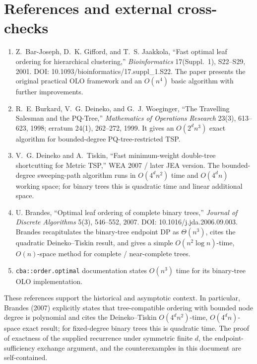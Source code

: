\documentclass[11pt]{article}
\theoremstyle{plain}
\begin{document}
\section*{References and external cross-checks}

\begin{enumerate}[label=\arabic*.]
\item Z.\ Bar-Joseph, D.~K. Gifford, and T.~S. Jaakkola, ``Fast optimal leaf
  ordering for hierarchical clustering,'' \emph{Bioinformatics} 17(Suppl.\ 1),
  S22--S29, 2001. DOI: 10.1093/bioinformatics/17.suppl\_1.S22. The paper
  presents the original practical OLO framework and an \(O(n^4)\) basic
  algorithm with further improvements.
\item R.~E. Burkard, V.~G. Deineko, and G.~J. Woeginger, ``The Travelling
  Salesman and the PQ-Tree,'' \emph{Mathematics of Operations Research} 23(3),
  613--623, 1998; erratum 24(1), 262--272, 1999. It gives an \(O(2^d n^3)\)
  exact algorithm for bounded-degree PQ-tree-restricted TSP.
\item V.~G. Deineko and A.~Tiskin, ``Fast minimum-weight double-tree
  shortcutting for Metric TSP,'' WEA 2007 / later JEA version. The
  bounded-degree sweeping-path algorithm runs in \(O(4^d n^2)\) time and
  \(O(4^d n)\) working space; for binary trees this is quadratic time and
  linear additional space.
\item U. Brandes, ``Optimal leaf ordering of complete binary trees,''
  \emph{Journal of Discrete Algorithms} 5(3), 546--552, 2007. DOI:
  10.1016/j.jda.2006.09.003. Brandes recapitulates the binary-tree endpoint DP
  as \(\Theta(n^3)\), cites the quadratic Deineko--Tiskin result, and gives a
  simple \(O(n^2\log n)\)-time, \(O(n)\)-space method for complete /
  near-complete trees.
\item \texttt{cba::order.optimal} documentation states \(O(n^3)\) time for its
  binary-tree OLO implementation.
\end{enumerate}

These references support the historical and asymptotic context. In particular,
Brandes (2007) explicitly states that tree-compatible ordering with bounded
node degree is polynomial and cites the Deineko--Tiskin
\(O(4^d n^2)\)-time, \(O(4^d n)\)-space exact result; for fixed-degree binary
trees this is quadratic time. The proof of exactness of the supplied recurrence
under symmetric finite \(d\), the endpoint-sufficiency exchange argument, and
the counterexamples in this document are self-contained.
\end{document}
